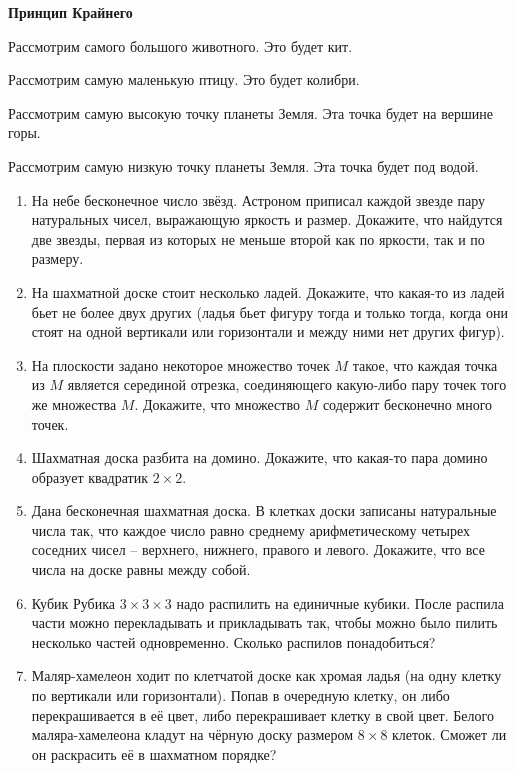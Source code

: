 \documentclass{article}
\begin{document}
\large
	
\begin{center}
	\textbf{Принцип Крайнего}
\end{center}

Рассмотрим самого большого животного. Это будет кит.

Рассмотрим самую маленькую птицу. Это будет колибри.

Рассмотрим самую высокую точку планеты Земля. Эта точка будет на вершине горы.

Рассмотрим самую низкую точку планеты Земля. Эта точка будет под водой.

\begin{enumerate}[label*=\protect\fbox{\arabic{enumi}}]
	
\item На небе бесконечное число звёзд. Астроном приписал каждой звезде пару натуральных чисел, выражающую яркость и размер. Докажите, что найдутся две звезды, первая из которых не меньше второй как по яркости, так и по размеру.

\item На шахматной доске стоит несколько ладей. Докажите, что какая-то из ладей бьет не более двух других (ладья бьет фигуру тогда и только тогда, когда они стоят на одной вертикали или горизонтали и между ними нет других фигур).

\item На плоскости задано некоторое множество точек $M$ такое, что каждая точка из $M$ является серединой отрезка, соединяющего какую-либо пару точек того же множества $M$. Докажите, что множество $M$ содержит бесконечно много точек.

\item Шахматная доска разбита на домино. Докажите, что какая-то пара домино образует квадратик $2\times 2$.

\item Дана бесконечная шахматная доска. В клетках доски записаны натуральные числа так, что каждое число равно среднему арифметическому четырех соседних чисел – верхнего, нижнего, правого и левого. Докажите, что все числа на доске равны между собой.

\item Кубик Рубика $3\times 3 \times 3$ надо распилить на единичные кубики. После распила части можно перекладывать и прикладывать так, чтобы можно было пилить несколько частей одновременно. Сколько распилов понадобиться?

\item Маляр-хамелеон ходит по клетчатой доске как хромая ладья (на одну клетку по вертикали или горизонтали). Попав в очередную клетку, он либо перекрашивается в её цвет, либо перекрашивает клетку в свой цвет. Белого маляра-хамелеона кладут на чёрную доску размером $8\times 8$ клеток. Сможет ли он раскрасить её в шахматном порядке?


\end{enumerate}
\end{document}
